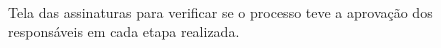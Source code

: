 \begin{figure}[htb]
	\centering
	\mbox{%
		\qquad
	}	
	
\end{figure}
\newpage
Tela das assinaturas para verificar se o processo teve a aprovação dos responsáveis em cada etapa realizada.


